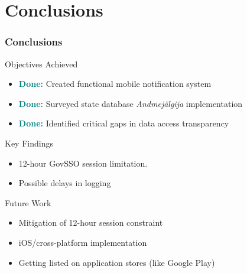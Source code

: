 \documentclass[aspectratio=169,11pt]{beamer}
\begin{document}

\section{Conclusions}

\begin{frame}
\frametitle{Conclusions}
\begin{block}{Objectives Achieved}
\begin{itemize}
    \item \textcolor{teal}{\textbf{Done:}} Created functional mobile notification system
    \item \textcolor{teal}{\textbf{Done:}} Surveyed state database \textit{Andmejälgija} implementation
    \item \textcolor{teal}{\textbf{Done:}} Identified critical gaps in data access transparency
\end{itemize}
\end{block}

\begin{block}{Key Findings}
\begin{itemize}
    \item 12-hour GovSSO session limitation.
    \item Possible delays in logging
\end{itemize}
\end{block}

\begin{block}{Future Work}
\begin{itemize}
    \item Mitigation of 12-hour session constraint
    \item iOS/cross-platform implementation
    \item Getting listed on application stores (like Google Play)
\end{itemize}
\end{block}
\end{frame}
\end{document}
